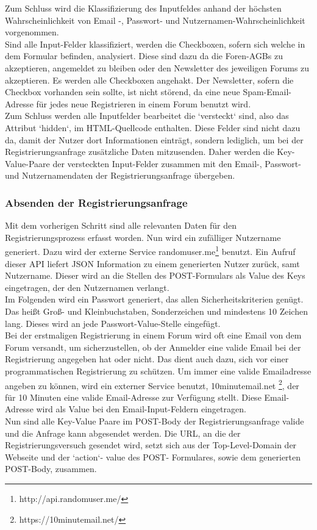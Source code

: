 Zum Schluss wird die Klassifizierung des Inputfeldes anhand der höchsten Wahrscheinlichkeit von Email -, Passwort- und Nutzernamen-Wahrscheinlichkeit vorgenommen. \\
Sind alle Input-Felder klassifiziert, werden die Checkboxen, sofern sich welche in dem Formular befinden, analysiert. Diese sind dazu da die Foren-AGBs zu akzeptieren, angemeldet zu bleiben oder den Newsletter des jeweiligen Forums zu akzeptieren.
Es werden alle Checkboxen angehakt. Der Newsletter, sofern die Checkbox vorhanden sein sollte, ist nicht störend, da eine neue Spam-Email-Adresse für jedes neue Registrieren in einem Forum benutzt wird.\\
Zum Schluss werden alle Inputfelder bearbeitet die `versteckt` sind, also das Attribut `hidden`, im HTML-Quellcode enthalten.
Diese Felder sind nicht dazu da, damit der Nutzer dort Informationen einträgt, sondern lediglich, um bei der Registrierungsanfrage zusätzliche Daten mitzusenden. Daher werden die Key-Value-Paare der versteckten Input-Felder zusammen mit den Email-, Passwort- und Nutzernamendaten der Registrierungsanfrage übergeben.

\subsubsection{Absenden der Registrierungsanfrage}
Mit dem vorherigen Schritt sind alle relevanten Daten für den Registrierungsprozess erfasst worden. Nun wird ein zufälliger Nutzername generiert. Dazu wird der externe Service randomuser.me\footnote{http://api.randomuser.me/} benutzt. Ein Aufruf dieser API liefert JSON Information zu einem generierten Nutzer zurück, samt Nutzername. Dieser wird an die Stellen des POST-Formulars als Value des Keys eingetragen, der den Nutzernamen verlangt.\\
Im Folgenden wird ein Passwort generiert, das allen Sicherheitskriterien genügt. Das heißt Groß- und Kleinbuchstaben, Sonderzeichen und mindestens 10 Zeichen lang. Dieses wird an jede Passwort-Value-Stelle eingefügt.\\
Bei der erstmaligen Registrierung in einem Forum wird oft eine Email von dem Forum versandt, um sicherzustellen, ob der Anmelder eine valide Email bei der Registrierung angegeben hat oder nicht. Das dient auch dazu, sich vor einer programmatischen Registrierung zu schützen. Um immer eine valide Emailadresse angeben zu können, wird ein externer Service benutzt, 10minutemail.net \footnote{https://10minutemail.net/}, der für 10 Minuten eine valide Email-Adresse zur Verfügung stellt. Diese Email-Adresse wird als Value bei den Email-Input-Feldern eingetragen.\\
Nun sind alle Key-Value Paare im POST-Body der Registrierungsanfrage valide und die Anfrage kann abgesendet werden.
Die URL, an die der Registrierungsversuch gesendet wird, setzt sich aus der Top-Level-Domain der Webseite und der `action`- value des POST- Formulares, sowie dem generierten POST-Body, zusammen.

